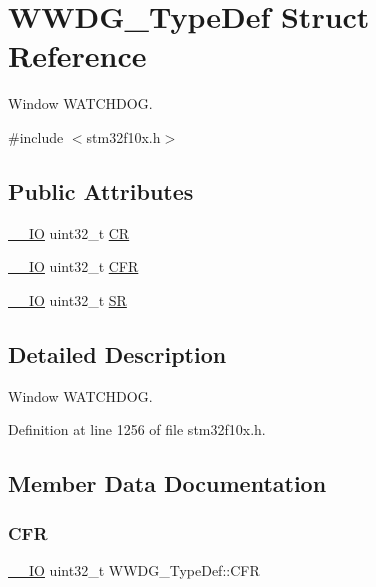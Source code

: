 \hypertarget{struct_w_w_d_g___type_def}{}\section{W\+W\+D\+G\+\_\+\+Type\+Def Struct Reference}
\label{struct_w_w_d_g___type_def}


Window W\+A\+T\+C\+H\+D\+OG.  




{\ttfamily \#include $<$stm32f10x.\+h$>$}

\subsection*{Public Attributes}
\begin{DoxyCompactItemize}
\item 
\hyperlink{core__sc300_8h_aec43007d9998a0a0e01faede4133d6be}{\+\_\+\+\_\+\+IO} uint32\+\_\+t \hyperlink{struct_w_w_d_g___type_def_a4caf530d45f7428c9700d9c0057135f8}{CR}
\item 
\hyperlink{core__sc300_8h_aec43007d9998a0a0e01faede4133d6be}{\+\_\+\+\_\+\+IO} uint32\+\_\+t \hyperlink{struct_w_w_d_g___type_def_adcd6a7e5d75022e46ce60291f4b8544c}{C\+FR}
\item 
\hyperlink{core__sc300_8h_aec43007d9998a0a0e01faede4133d6be}{\+\_\+\+\_\+\+IO} uint32\+\_\+t \hyperlink{struct_w_w_d_g___type_def_a15655cda4854cc794db1f27b3c0bba38}{SR}
\end{DoxyCompactItemize}


\subsection{Detailed Description}
Window W\+A\+T\+C\+H\+D\+OG. 

Definition at line 1256 of file stm32f10x.\+h.



\subsection{Member Data Documentation}
\mbox{\label{struct_w_w_d_g___type_def_adcd6a7e5d75022e46ce60291f4b8544c}} 
\subsubsection{\texorpdfstring{C\+FR}{CFR}}
{\footnotesize\ttfamily \hyperlink{core__sc300_8h_aec43007d9998a0a0e01faede4133d6be}{\+\_\+\+\_\+\+IO} uint32\+\_\+t W\+W\+D\+G\+\_\+\+Type\+Def\+::\+C\+FR}



